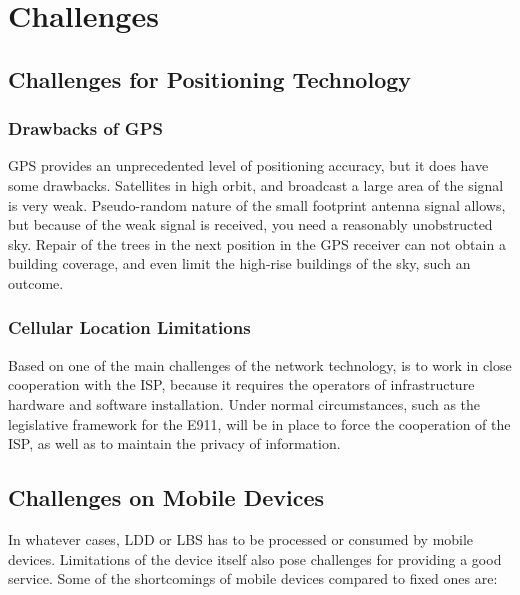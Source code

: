 \documentclass[12pt,a4paper]{article}
\begin{document}
\section{Challenges} %
\label{sec:challenges}

\subsection{Challenges for Positioning Technology} %
\label{sub:challenges_for_positioning_technology}

\subsubsection{Drawbacks of GPS} %
\label{ssub:drawbacks_of_gps}
GPS provides an unprecedented level of positioning accuracy, but it does have some drawbacks. Satellites in high orbit, and broadcast a large area of ​​the signal is very weak. Pseudo-random nature of the small footprint antenna signal allows, but because of the weak signal is received, you need a reasonably unobstructed sky. Repair of the trees in the next position in the GPS receiver can not obtain a building coverage, and even limit the high-rise buildings of the sky, such an outcome.
 \cite{DRoza:2003wz}

\subsubsection{Cellular Location Limitations} %
\label{ssub:cellular_location_limitations}
Based on one of the main challenges of the network technology, is to work in close cooperation with the ISP, because it requires the operators of infrastructure hardware and software installation. Under normal circumstances, such as the legislative framework for the E911, will be in place to force the cooperation of the ISP, as well as to maintain the privacy of information. \cite{wiki-cellloc}


\subsection{Challenges on Mobile Devices} %
\label{sub:challenges_on_mobile_devices}
In whatever cases, LDD or LBS has to be processed or consumed by mobile devices. Limitations of the device itself also pose challenges for providing a good service. Some of the shortcomings of mobile devices compared to fixed ones are:
\end{document}
